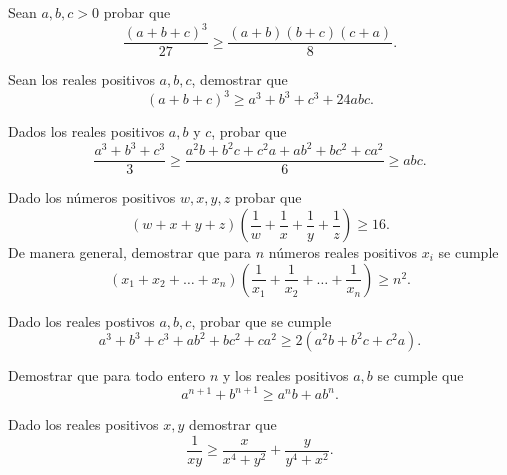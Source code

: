 \documentclass[12pt]{article}
\begin{document}
    \begin{prob-without-section}
        Sean $a,b,c > 0$ probar que
        \[
            \frac{(a + b + c)^3}{27} \geq \frac{(a + b)(b + c)(c + a)}{8}.
        \]
    \end{prob-without-section}

    \begin{prob-without-section}
        Sean los reales positivos $a,b,c$, demostrar que
        \[
            (a + b + c)^3 \geq a^3 + b^3 + c^3 + 24abc.
        \]
    \end{prob-without-section}

    \begin{prob-without-section}
        Dados los reales positivos $a,b$ y $c$, probar que
        \[
            \frac{a^3 + b^3 + c^3}{3} \geq \frac{a^2 b + b^2 c + c^2 a + a b^2 + b c^2 + c a^2}{6} \geq abc.
        \]
    \end{prob-without-section}

    \begin{prob-without-section}
        Dado los números positivos $w,x,y,z$ probar que
        \[
            (w + x + y + z)\left(\frac{1}{w} + \frac{1}{x} + \frac{1}{y} + \frac{1}{z}\right) \geq 16.
        \]
        De manera general, demostrar que para $n$ números reales positivos $x_i$ se cumple
        \[
            (x_1 + x_2 + \ldots + x_n)\left(\frac{1}{x_1} + \frac{1}{x_2} + \ldots + \frac{1}{x_n}\right) \geq n^2.
        \]
    \end{prob-without-section}

    \begin{prob-without-section}
        Dado los reales postivos $a,b,c$, probar que se cumple
        \[
            a^3 + b^3 + c^3 + ab^2  + bc^2  + ca^2  \geq 2(a^2 b + b^2 c + c^2 a).
        \]
    \end{prob-without-section}

    \begin{prob-without-section}
        Demostrar que para todo entero $n$ y los reales positivos $a,b$ se cumple que
        \[
            a^{n + 1} + b^{n + 1} \geq a^n b + a b^n.
        \]
    \end{prob-without-section}

    \begin{prob-without-section}
        Dado los reales positivos $x,y$ demostrar que
        \[
            \frac{1}{xy} \geq \frac{x}{x^4 + y^2} + \frac{y}{y^4 + x^2}.
        \]
    \end{prob-without-section}
\end{document}
